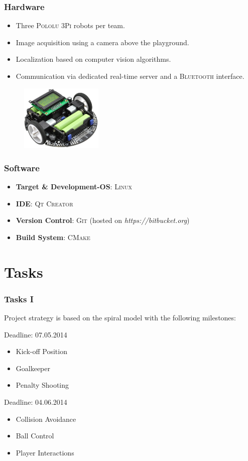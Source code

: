 \documentclass[hyperref={pdfpagelabels=false}]{beamer}
\begin{document}
\begin{frame}
	\frametitle{Hardware} 
	\begin{itemize}
		\item Three \textsc{Pololu 3Pi} robots per team.
		\item Image acquisition using a camera above the playground.		
		\item Localization based on computer vision algorithms.
		\item Communication via dedicated real-time server and a \textsc{Bluetooth} interface.
	\end{itemize}
	\begin{figure}
		\centering
		\includegraphics[width=0.35\textwidth]{3pi}
	\end{figure}
\end{frame}

\begin{frame}
	\frametitle{Software}
	\begin{itemize}
		\item  \textbf{Target \& Development-OS}: \textsc{Linux}
		\item  \textbf{IDE}: \textsc{Qt Creator}
		\item  \textbf{Version Control}: \textsc{Git} (hosted on \textit{https://bitbucket.org})
		\item  \textbf{Build System}: \textsc{CMake}
	\end{itemize}
\end{frame}


\section{Tasks} 
\begin{frame}
	\frametitle{Tasks I} 
	Project strategy is based on the spiral model with the following milestones:
	\begin{block}{Deadline: 07.05.2014}
		\begin{itemize}
			\item Kick-off Position
			\item Goalkeeper
			\item Penalty Shooting
		\end{itemize}
	\end{block}
	\begin{block}{Deadline: 04.06.2014}
		\begin{itemize}
			\item Collision Avoidance
			\item Ball Control
			\item Player Interactions
		\end{itemize}
	\end{block}
\end{frame}
\end{document}
